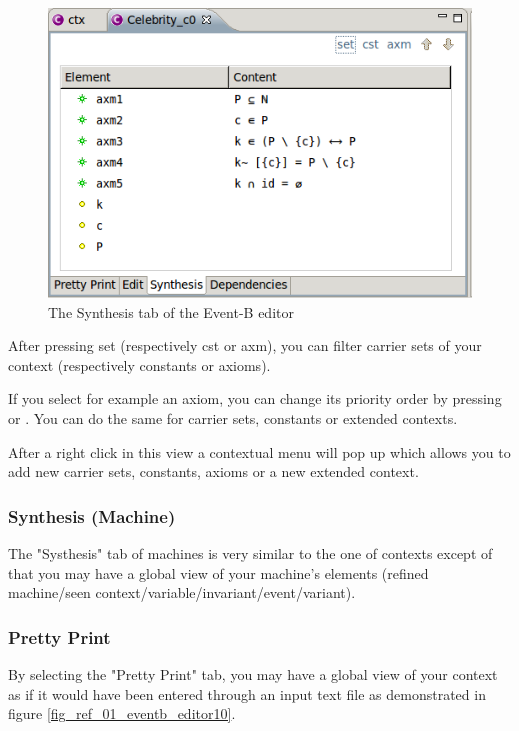 \begin{figure}[!h]
\begin{center}
	\includegraphics{img/reference/ref_01_eventb_editor11.png}
	\caption{The Synthesis tab of the Event-B editor}
	\label{fig_ref_01_eventb_editor11}
\end{center}
\end{figure}

After pressing set (respectively cst or axm), you can filter carrier sets of your context (respectively constants or axioms).

If you select for example an axiom, you can change its priority order by pressing  or ‎. You can do the same for carrier sets, constants or extended contexts.

After a right click in this view a contextual menu will pop up which allows you to add new carrier sets, constants, axioms or a new extended context. 

\subsubsection{Synthesis (Machine)}

The "Systhesis" tab of machines is very similar to the one of contexts except of that you may have a global view of your machine's elements (refined machine/seen context/variable/invariant/event/variant).

\subsubsection{Pretty Print}

By selecting the "Pretty Print" tab, you may have a global view of your context as if it would have been entered through an input text file as demonstrated in figure \ref{fig_ref_01_eventb_editor10}.

